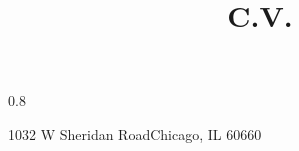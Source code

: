 \usepackage{etoolbox,changepage}
\patchcmd{\makehead}%
  {0.8\textwidth}%
  {\linewidth}%
  {}{}%
  
\title{C.V.}                               %
\address{Loyola University Chicago}{1032 W Sheridan Road}{Chicago, IL 60660}%


